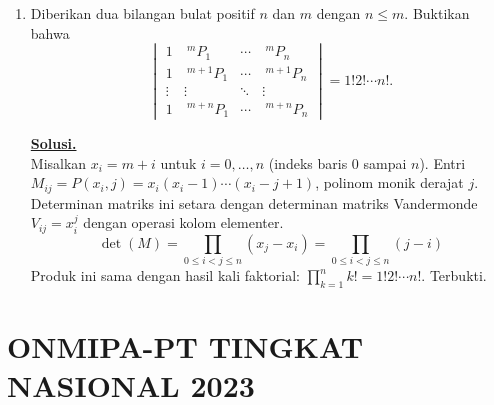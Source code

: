 \documentclass[12pt,twoside]{article}
\newenvironment{solution}
{
	\par\noindent\textbf{\underline{Solusi.}}\\
}
{
	\par
}
\begin{document}
\begin{enumerate}
\begin{solution}
          (b) $A = \mathcal{L}(V)$ untuk $V$ ruang vektor dimensi tak hingga dengan basis $\{e_1, e_2, \dots\}$.
          Pilih $a = L$ (Left Shift): $L(e_i) = e_{i-1}$ untuk $i>1, L(e_1)=0$.
          $r_L$ (perkalian kanan dengan $L$): $X L = 0 \implies X=0$ (karena $L$ surjektif kanan / punya invers kanan $R$). $r_L$ injektif.
          $l_L$ (perkalian kiri dengan $L$): $L X = 0$ tidak mengakibatkan $X=0$ (contoh $X$ proyeksi ke $e_1$). $l_L$ tidak injektif.
        \end{solution}
  \item Diberikan dua bilangan bulat positif $n$ dan $m$ dengan $n\leq m$. Buktikan bahwa
        $$ \begin{vmatrix}
            1      & ~^mP_1     & \cdots & ~^mP_n     \\
            1      & ~^{m+1}P_1 & \cdots & ~^{m+1}P_n \\
            \vdots & \vdots     & \ddots & \vdots     \\
            1      & ~^{m+n}P_1 & \cdots & ~^{m+n}P_n
          \end{vmatrix}	= 1!2!\cdots n!.	 $$
        \begin{solution}
          Misalkan $x_i = m+i$ untuk $i=0, \dots, n$ (indeks baris 0 sampai $n$).
          Entri $M_{ij} = P(x_i, j) = x_i(x_i-1)\cdots(x_i-j+1)$, polinom monik derajat $j$.
          Determinan matriks ini setara dengan determinan matriks Vandermonde $V_{ij} = x_i^j$ dengan operasi kolom elementer.
          \[ \det(M) = \prod_{0 \le i < j \le n} (x_j - x_i) = \prod_{0 \le i < j \le n} (j-i) \]
          Produk ini sama dengan hasil kali faktorial: $\prod_{k=1}^n k! = 1! 2! \cdots n!$.
          Terbukti.
        \end{solution}
\end{enumerate}

\pagebreak

\section{ONMIPA-PT TINGKAT NASIONAL 2023}
\end{document}
